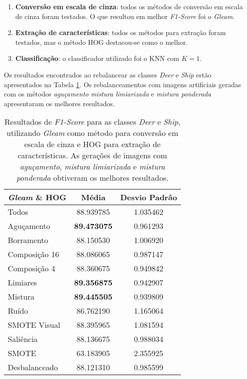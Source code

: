 \begin{enumerate}
\item \textbf{Conversão em escala de cinza}: todos os métodos de conversão em escala de cinza foram testados. O que resultou em melhor \textit{F1-Score} foi o \emph{Gleam}.

\item \textbf{Extração de características}: todos os métodos para extração foram testados, mas o método HOG destacou-se como o melhor.

\item \textbf{Classificação}: o classificador utilizado foi o KNN com $K=1$.

\end{enumerate}

Os resultados encontrados ao rebalancear as classes \textit{Deer} e \textit{Ship} estão apresentados na Tabela \ref{tab:resultados:5.1}. Os rebalanceamentos com imagens artificiais geradas com os métodos \emph{aguçamento} \textit{mistura limiarizada} e \textit{mistura ponderada} apresentaram os melhores resultados.

\begin{table}[!htbp]
\begin{center}
\caption{Resultados de \textit{F1-Score} para as classes \textit{Deer} e \textit{Ship}, utilizando \emph{Gleam} como método para conversão em escala de cinza e HOG para extração de características. As gerações de imagens com \textit{aguçamento}, \textit{mistura limiarizada} e \textit{mistura ponderada} obtiveram os melhores resultados.}
\label{tab:resultados:5.1}
\begin{tabular}{|l|c|c|}
\hline
\textbf{\emph{Gleam} \& HOG} & \textbf{Média}     & \textbf{Desvio Padrão} \\ \hline
   Todos        &  88.939785 &  1.035462  \\ \hline
  Aguçamento    &  \textbf{89.473075} &  0.961293  \\ \hline
  Borramento    &  88.150530 &  1.006920  \\ \hline
  Composição 16 &  88.086065 &  0.987147  \\ \hline
  Composição 4  &  88.360675 &  0.949842  \\ \hline
  Limiares      &  \textbf{89.356875} &  0.942907  \\ \hline
  Mistura       &  \textbf{89.445505} &  0.939809  \\ \hline
  Ruído         &  86.762190 &  1.165064  \\ \hline
  SMOTE Visual  &  88.395965 &  1.081594  \\ \hline
  Saliência     &  88.136675 &  0.988034  \\ \hline
 SMOTE          &  63.183905 &  2.355925  \\ \hline
Desbalanceado   &  88.121310 &  0.985599  \\ \hline
\end{tabular}
\end{center}
\end{table}

